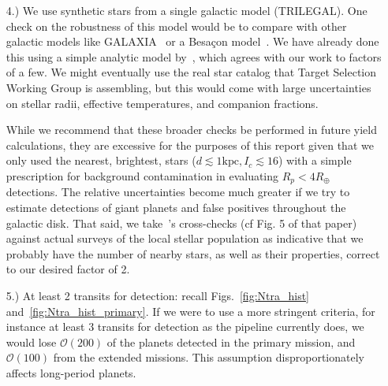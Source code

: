 \begin{itemize}
	
	\item [4.) We use synthetic stars from a single galactic model (TRILEGAL).]
	One check on the robustness of this model would be to compare with other galactic models like GALAXIA~\citep{sharma_galaxia_2011} or a Besa\c con model~\citep{robin2003synthetic}.
	We have already done this using a simple analytic model by~\citet{winn_searchable_2013}, which agrees with our work to factors of a few.
	We might eventually use the real star catalog that \tesss Target Selection Working Group is assembling, but this would come with large uncertainties on stellar radii, effective temperatures, and companion fractions.
	
	While we recommend that these broader checks be performed in future \tess yield calculations, they are excessive for the purposes of this report given that we only used the nearest, brightest, stars ($d\lesssim\mathrm{1kpc}, I_c\lesssim16$) with a simple prescription for background contamination in evaluating \tesss $R_p<4R_\oplus$ detections.
	The relative uncertainties become much greater if we try to estimate detections of giant planets and false positives throughout the galactic disk.
	That said, we take~'s cross-checks (cf Fig. 5 of that paper) against actual surveys of the local stellar population as indicative that we probably have the number of nearby stars, as well as their properties, correct to our desired factor of 2.
	
	\item [5.) At least 2 transits for detection:] recall Figs.~\ref{fig:Ntra_hist} and~\ref{fig:Ntra_hist_primary}.
	If we were to use a more stringent criteria, for instance at least 3 transits for detection as the \kepler pipeline currently does, we would lose $\mathcal{O}(200)$ of the planets detected in the primary mission, and $\mathcal{O}(100)$ from the extended missions.
	This assumption disproportionately affects long-period planets.
	
	

\end{itemize}
